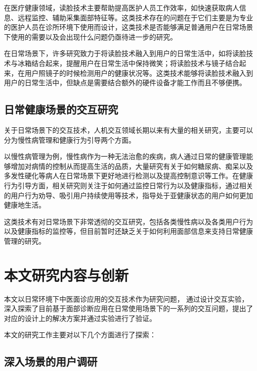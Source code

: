 在医疗健康领域，读脸技术主要帮助提高医护人员工作效率，如快速获取病人信息\cite{nwosu2016mobile}、远程监控\cite{Hossain2015Cloud}、辅助采集面部特征\cite{张红凯2015中医面诊信息采集与识别方法研究进展}等。这类技术存在的问题在于它们主要是为专业的医护人员在诊所环境下使用而设计，这类技术是否能够满足普通用户在日常场景下使用的需要以及会出现什么问题仍亟待进一步的研究。

在日常场景下，许多研究致力于将读脸技术融入到用户的日常生活中，如将读脸技术与冰箱结合起来，提醒用户在日常生活中保持微笑\cite{Tsujita2011Smiling}；将读脸技术与镜子结合起来，在用户照镜子的时候检测用户的健康状况\cite{andreu2015mirror}等。这类技术能够将读脸技术融入到用户的日常生活中，但缺点是需要结合额外的硬件设备才能工作而且不够便携。

\subsection{日常健康场景的交互研究}
关于日常场景下的交互技术，人机交互领域长期以来有大量的相关研究，主要可以分为慢性病管理和健康行为引导两个方面。

以慢性病管理为例，慢性病作为一种无法治愈的疾病，病人通过日常的健康管理能够增加对病情的控制从而提高生活的品质，大量研究有关于如何糖尿病\cite{mamykina2008mahi}、痴呆\cite{yasuda2009remote}以及多发性硬化\cite{ayobi2017quantifying}等病人在日常场景下更好地进行检测以及提高控制意识等工作。在健康行为引导方面，相关研究则关注于如何通过监控日常行为\cite{purpura2011fit4life,Inagawa2013A,bravata2007using,cordeiro2015barriers,lin2006fish, miller2014stepstream}以及健康指标\cite{kay2012lullaby,gronvall2013beyond,logan2007mobile,walters2010a}，通过相关的用户行为劝导、吸引用户持续使用等技术，指导处于亚健康状态的用户如何更加健康地生活。

这类技术有对日常场景下非常透彻的交互研究，包括各类慢性病以及各类用户行为以及健康指标的监控等，但目前暂时还缺乏关于如何利用面部信息来支持日常健康管理的研究。

\section{本文研究内容与创新}

本文以日常环境下中医面诊应用的交互技术作为研究问题，
通过设计交互实验，深入探索了目前基于面部诊断应用在日常使用场景下的一系列的交互问题，提出了对应的设计上的解决方案并通过实验进行了验证。

本文的研究工作主要对以下几个方面进行了探索：

\subsection{深入场景的用户调研}

